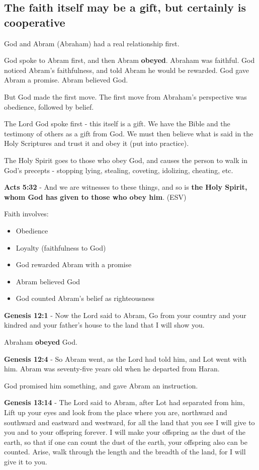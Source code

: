 \documentclass[11pt]{article}
\begin{document}
\subsection{The faith itself may be a gift, but certainly is cooperative}
\label{sec:org57f8f5b}
God and Abram (Abraham) had a real relationship first.

God spoke to Abram first, and then Abram \textbf{obeyed}.
Abraham was faithful.
God noticed Abram's faithfulness, and told Abram he would be rewarded.
God gave Abram a promise.
Abram believed God.

But God made the first move.
The first move from Abraham's perspective was obedience, followed by belief.

The Lord God spoke first - this itself is a gift. We have the Bible and the testimony of others as a gift from God.
We must then believe what is said in the Holy Scriptures and trust it and obey it (put into practice).

The Holy Spirit goes to those who obey God, and causes the person to walk in God's precepts - stopping lying, stealing, coveting, idolizing, cheating, etc.

\textbf{Acts 5:32} - And we are witnesses to these things, and so is \textbf{the Holy Spirit, whom God has given to those who obey him}. (ESV)

Faith involves:
\begin{itemize}
\item Obedience
\item Loyalty (faithfulness to God)
\item God rewarded Abram with a promise
\item Abram believed God
\item God counted Abram's belief as righteousness
\end{itemize}

\textbf{Genesis 12:1} - Now the Lord said to Abram, Go from your country and your kindred and your father's house to the land that I will show you.

Abraham \textbf{obeyed} God.

\textbf{Genesis 12:4} - So Abram went, as the Lord had told him, and Lot went with him. Abram was seventy-five years old when he departed from Haran.

God promised him something, and gave Abram an instruction.

\textbf{Genesis 13:14} - The Lord said to Abram, after Lot had separated from him, Lift up your eyes and look from the place where you are, northward and southward and eastward and westward, for all the land that you see I will give to you and to your offspring forever. I will make your offspring as the dust of the earth, so that if one can count the dust of the earth, your offspring also can be counted. Arise, walk through the length and the breadth of the land, for I will give it to you.
\end{document}
